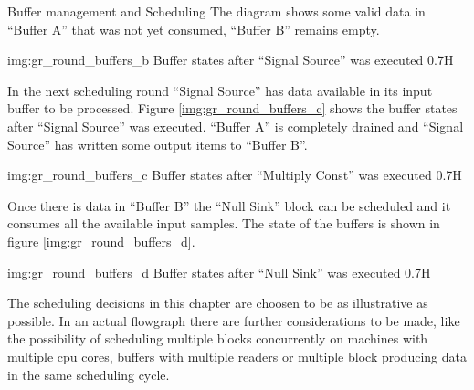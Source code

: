 \begin{subchapter}{Buffer management and Scheduling}
  The diagram shows some valid data in ``Buffer A'' that was
  not yet consumed, ``Buffer B'' remains empty.

               {img:gr_round_buffers_b}
               {Buffer states after ``Signal Source'' was executed}
               {0.7}{H}

  In the next scheduling round ``Signal Source'' has data
  available in its input buffer to be processed.
  Figure \ref{img:gr_round_buffers_c} shows the buffer states
  after ``Signal Source'' was executed.
  ``Buffer A'' is completely drained and ``Signal Source'' has
  written some output items to ``Buffer B''.

               {img:gr_round_buffers_c}
               {Buffer states after ``Multiply Const'' was executed}
               {0.7}{H}

  Once there is data in ``Buffer B'' the ``Null Sink'' block
  can be scheduled and it consumes all the available input samples.
  The state of the buffers is shown in figure \ref{img:gr_round_buffers_d}.

               {img:gr_round_buffers_d}
               {Buffer states after ``Null Sink'' was executed}
               {0.7}{H}

  The scheduling decisions in this chapter are choosen to be
  as illustrative as possible. In an actual flowgraph there are
  further considerations to be made, like the possibility of scheduling
  multiple blocks concurrently on machines with multiple \gls{cpu} cores,
  buffers with multiple readers or multiple block producing data
  in the same scheduling cycle.
\end{subchapter}

